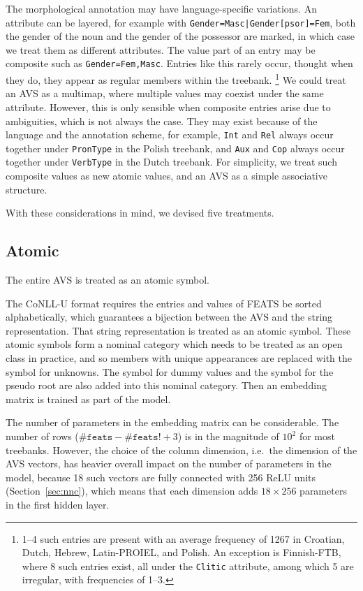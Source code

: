\documentclass[11pt]{article}
\begin{document}
The morphological annotation may have language-specific variations.
An attribute can be layered,
for example with \texttt{Gender=Masc|Gender[psor]=Fem},
both the gender of the noun and the gender of the possessor are marked,
in which case we treat them as different attributes.
The value part of an entry may be composite such as \texttt{Gender=Fem,Masc}.
Entries like this rarely occur, thought when they do, they appear as regular members within the treebank.%
\footnote{1--4 such entries are present with an average frequency of 1267 in Croatian, Dutch, Hebrew, Latin-PROIEL, and Polish.
  An exception is Finnish-FTB, where 8 such entries exist, all under the \texttt{Clitic} attribute,
  among which 5 are irregular, with frequencies of 1--3.}
We could treat an AVS as a multimap, where multiple values may coexist under the same attribute.
However, this is only sensible when composite entries arise due to ambiguities,
which is not always the case.
They may exist because of the language and the annotation scheme,
for example, \texttt{Int} and \texttt{Rel} always occur together under \texttt{PronType} in the Polish treebank,
and \texttt{Aux} and \texttt{Cop} always occur together under \texttt{VerbType} in the Dutch treebank.
For simplicity, we treat such composite values as new atomic values,
and an AVS as a simple associative structure.

With these considerations in mind, we devised five treatments.

\subsection*{Atomic}

The entire AVS is treated as an atomic symbol.

The CoNLL-U format requires the entries and values of FEATS be sorted alphabetically,
which guarantees a bijection between the AVS and the string representation.
That string representation is treated as an atomic symbol.
These atomic symbols form a nominal category which needs to be treated as an open class in practice,
and so members with unique appearances are replaced with the symbol for unknowns.
The symbol for dummy values and the symbol for the pseudo root are also added into this nominal category.
Then an embedding matrix is trained as part of the model.

The number of parameters in the embedding matrix can be considerable.
The number of rows (\(\texttt{\#feats} - \texttt{\#feats!} + 3\)) is in the magnitude of \(10^{2}\) for most treebanks.
However, the choice of the column dimension, i.e.\ the dimension of the AVS vectors,
has heavier overall impact on the number of parameters in the model,
because 18 such vectors are fully connected with 256 ReLU units (Section~\ref{sec:nnc}),
which means that each dimension adds \(18 \times 256\) parameters in the first hidden layer.
\end{document}
